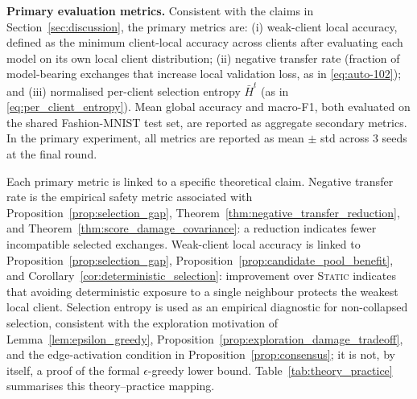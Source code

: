 \documentclass[conference]{IEEEtran}
\begin{document}
\textbf{Primary evaluation metrics.}
Consistent with the claims in Section~\ref{sec:discussion}, the primary metrics are: (i) weak-client local accuracy, defined as the minimum client-local accuracy across clients after evaluating each model on its own local client distribution; (ii) negative transfer rate (fraction of model-bearing exchanges that increase local validation loss, as in \eqref{eq:auto-102}); and (iii) normalised per-client selection entropy $\bar{H}^t$ (as in \eqref{eq:per_client_entropy}). Mean global accuracy and macro-F1, both evaluated on the shared Fashion-MNIST test set, are reported as aggregate secondary metrics. In the primary experiment, all metrics are reported as mean $\pm$ std across 3 seeds at the final round.

Each primary metric is linked to a specific theoretical claim. Negative transfer rate is the empirical safety metric associated with Proposition~\ref{prop:selection_gap}, Theorem~\ref{thm:negative_transfer_reduction}, and Theorem~\ref{thm:score_damage_covariance}: a reduction indicates fewer incompatible selected exchanges. Weak-client local accuracy is linked to Proposition~\ref{prop:selection_gap}, Proposition~\ref{prop:candidate_pool_benefit}, and Corollary~\ref{cor:deterministic_selection}: improvement over \textsc{Static} indicates that avoiding deterministic exposure to a single neighbour protects the weakest local client. Selection entropy is used as an empirical diagnostic for non-collapsed selection, consistent with the exploration motivation of Lemma~\ref{lem:epsilon_greedy}, Proposition~\ref{prop:exploration_damage_tradeoff}, and the edge-activation condition in Proposition~\ref{prop:consensus}; it is not, by itself, a proof of the formal $\epsilon$-greedy lower bound. Table~\ref{tab:theory_practice} summarises this theory--practice mapping.
\end{document}
